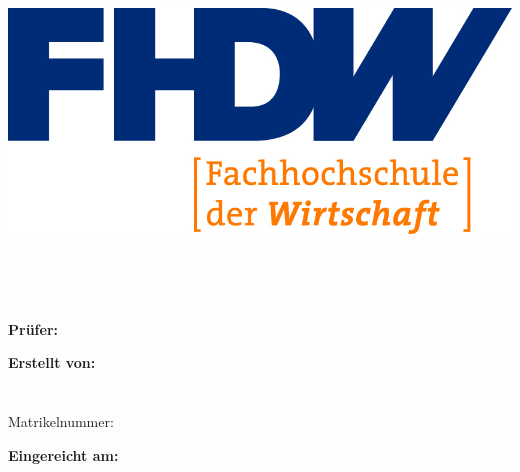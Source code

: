 
\begin{titlepage}

    \begin{center}
    
        \includegraphics[scale=1.20]{abbildungen/fhdw}\\
    
        \vspace{.7cm}
    
        \Huge{\bfseries\dokumententyp}
    
        ~\vspace{.5cm}\\
    
        \LARGE{\dokumententitel}
    
        ~\vspace{.5cm}\\
    
        \large{
            \textbf{Prüfer:}\vspace{1mm}\\
            \dokumentenpruefer
    
            \vspace{1.5cm}
    
            \textbf{Erstellt von:}\vspace{1mm}\\
            \dokumentenautor\\
            \dokumentenautoradress\\
            Matrikelnummer: \dokumentenautormatrikel
    
            \vspace{1.5cm}
    
            \textbf{Eingereicht am:}\vspace{1mm}\\
            \abgabedatum
        }
    
    \end{center}
    
\end{titlepage}